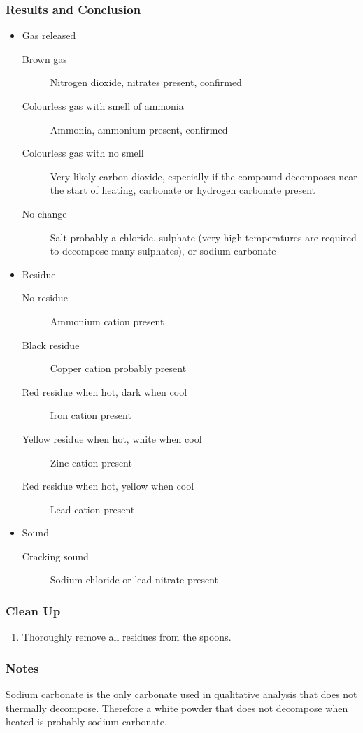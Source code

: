 \subsubsection{Results and Conclusion}
\begin{itemize}
\item{Gas released}
\begin{description}
\item[Brown gas]{Nitrogen dioxide, nitrates present, confirmed}
\item[Colourless gas with smell of ammonia]{Ammonia, ammonium present, confirmed}
\item[Colourless gas with no smell]{Very likely carbon dioxide, especially if the compound decomposes near the start of heating, carbonate or hydrogen carbonate present}
\item[No change]{Salt probably a chloride, sulphate (very high temperatures are required to decompose many sulphates), or sodium carbonate}
\end{description}
\item{Residue}
\begin{description}
\item[No residue]{Ammonium cation present}
\item[Black residue]{Copper cation probably present}
\item[Red residue when hot, dark when cool]{Iron cation present}
\item[Yellow residue when hot, white when cool]{Zinc cation present}
\item[Red residue when hot, yellow when cool]{Lead cation present}
\end{description}
\item{Sound}
\begin{description}
\item[Cracking sound]{Sodium chloride or lead nitrate present}
\end{description}
\end{itemize}

\subsubsection{Clean Up}
\begin{enumerate}
\item{Thoroughly remove all residues from the spoons.}
\end{enumerate}

\subsubsection{Notes}
Sodium carbonate is the only carbonate used in qualitative analysis that does not thermally decompose. Therefore a white powder that does not decompose when heated is probably sodium carbonate.

